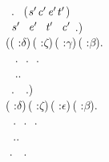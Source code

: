 \begin{holmath}
\,\,\,.\,\,\,\,\HOLSymConst{=}\,(\ensuremath{\HOLBoundVar{s}\sp{\prime{}}}\HOLSymConst{,}\ensuremath{\HOLBoundVar{c}\sp{\prime{}}}\HOLSymConst{,}\ensuremath{\HOLBoundVar{e}\sp{\prime{}}}\HOLSymConst{,}\ensuremath{\HOLBoundVar{t}\sp{\prime{}}})\,\HOLSymConst{\HOLTokenImp{}}\\
\,\,\,\ensuremath{\HOLBoundVar{s}\sp{\prime{}}}\,\HOLSymConst{=}\,\,\HOLSymConst{\HOLTokenConj{}}\,\ensuremath{\HOLBoundVar{e}\sp{\prime{}}}\,\HOLSymConst{=}\,\,\HOLSymConst{\HOLTokenConj{}}\,\ensuremath{\HOLBoundVar{t}\sp{\prime{}}}\,\HOLSymConst{=}\,\,\HOLSymConst{\HOLTokenConj{}}\,\ensuremath{\HOLBoundVar{c}\sp{\prime{}}}\,\HOLSymConst{\HOLTokenIn{}}\,.)\,\HOLSymConst{\HOLTokenConj{}}\\
(\HOLSymConst{\HOLTokenForall{}}( :\ensuremath{\delta})\,( :\ensuremath{\zeta})\,( :\ensuremath{\gamma})\,( :\ensuremath{\beta}).\\
\,\,\,\,\HOLSymConst{\HOLTokenIn{}}\,.\,\HOLSymConst{\HOLTokenConj{}}\,\,\HOLSymConst{\HOLTokenIn{}}\,.\,\HOLSymConst{\HOLTokenConj{}}\,\,\HOLSymConst{\HOLTokenIn{}}\,.\,\HOLSymConst{\HOLTokenConj{}}\\
\,\,\,\,\HOLSymConst{\HOLTokenIn{}}\,..\,\HOLSymConst{\HOLTokenImp{}}\\
\,\,\,.\,\,\,\,\,\HOLSymConst{\HOLTokenIn{}}\,.)\,\HOLSymConst{\HOLTokenConj{}}\\
\HOLSymConst{\HOLTokenForall{}}( :\ensuremath{\delta})\,( :\ensuremath{\zeta})\,( :\ensuremath{\epsilon})\,( :\ensuremath{\beta}).\\
\,\,\,\HOLSymConst{\HOLTokenIn{}}\,.\,\HOLSymConst{\HOLTokenConj{}}\,\,\HOLSymConst{\HOLTokenIn{}}\,.\,\HOLSymConst{\HOLTokenConj{}}\,\,\HOLSymConst{\HOLTokenIn{}}\,.\,\HOLSymConst{\HOLTokenConj{}}\\
\,\,\,\HOLSymConst{\HOLTokenIn{}}\,..\,\HOLSymConst{\HOLTokenImp{}}\\
\,\,.\,\,\,\,\,\HOLSymConst{\HOLTokenIn{}}\,.
\end{holmath}   

